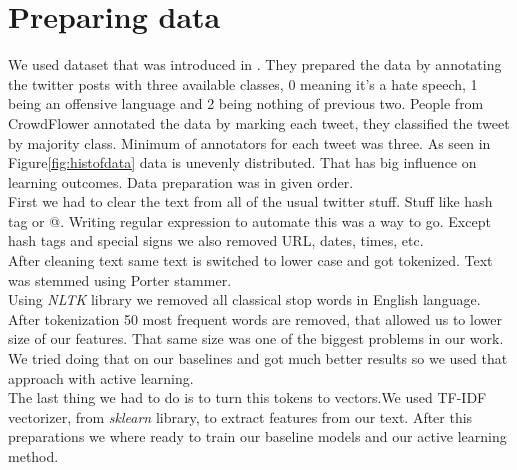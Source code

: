 \documentclass[10pt, a4paper]{article}
\begin{document}
\section{Preparing data}
We used dataset that was introduced in \cite{Davidson2017AutomatedHS}. They prepared the data by annotating the twitter posts with three available classes, 0 meaning it's a hate speech, 1 being an offensive language and 2 being nothing of previous two. People from CrowdFlower annotated the data by marking each tweet, they classified the tweet by majority class. Minimum of annotators for each tweet was three.
As seen in Figure\ref{fig:histofdata} data is unevenly distributed. That has big influence on learning outcomes. Data preparation was in given order.
\\First we had to clear the text from all of the usual twitter stuff. Stuff like hash tag or @. Writing regular expression to automate this was a way to go. Except hash tags and special signs we also removed URL, dates, times, etc.
\\After cleaning text same text is switched to lower case and got tokenized. Text was stemmed using Porter stammer.
\\Using \textit{NLTK} library we removed all classical stop words in English language. After tokenization 50 most frequent words are removed, that allowed us to lower size of our features. That same size was one of the biggest problems in our work.
We tried doing that on our baselines and got much better results so we used that approach with active learning.
\\The last thing we had to do is to turn this tokens to vectors.We used TF-IDF vectorizer, from \textit{sklearn} library, to extract features from our text. After this preparations we where ready to train our baseline models and our active learning method.
\begin{table}[t!]
	\centering
	\caption{First row shows the original tweet post from dataset, the second row shows cleaned, tokenized and steammed tweet post}
	\label{tbl:prepData}
\end{table}
\end{document}
